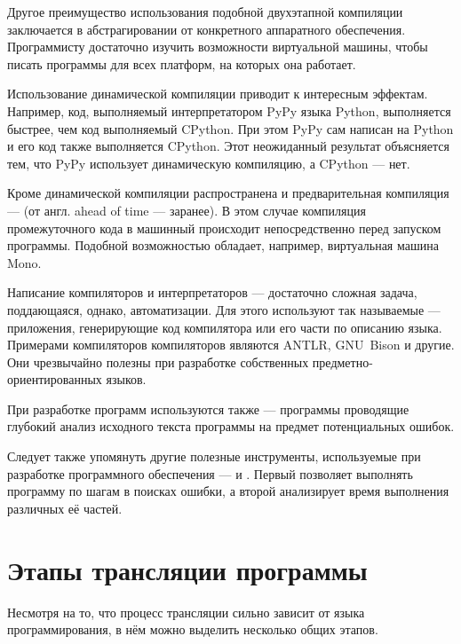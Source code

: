 Другое преимущество использования подобной двухэтапной компиляции
заключается в абстрагировании от конкретного аппаратного
обеспечения. Программисту достаточно изучить возможности виртуальной
машины, чтобы писать программы для всех платформ, на которых она
работает.

Использование динамической компиляции приводит к интересным эффектам.
Например, код, выполняемый интерпретатором PyPy языка Python,
выполняется быстрее, чем код выполняемый CPython. При этом PyPy сам
написан на Python и его код также выполняется CPython. Этот
неожиданный результат объясняется тем, что PyPy использует
динамическую компиляцию, а CPython — нет.

Кроме динамической компиляции распространена и предварительная
компиляция —  (от англ. ahead of
time — заранее). В этом случае компиляция промежуточного кода в
машинный происходит непосредственно перед запуском программы. Подобной
возможностью обладает, например, виртуальная машина Mono.


Написание компиляторов и интерпретаторов — достаточно сложная задача,
поддающаяся, однако, автоматизации. Для этого используют так
называемые  —
приложения, генерирующие код компилятора или его части по описанию
языка. Примерами компиляторов компиляторов являются ANTLR, GNU~Bison и
другие. Они чрезвычайно полезны при разработке собственных
предметно-ориентированных языков.

При разработке программ используются также
 — программы
проводящие глубокий анализ исходного текста программы на предмет
потенциальных ошибок.

Следует также упомянуть другие полезные инструменты, используемые при
разработке программного обеспечения —  и
. Первый позволяет выполнять
программу по шагам в поисках ошибки, а второй анализирует время
выполнения различных её частей.

\section{Этапы трансляции программы}


Несмотря на то, что процесс трансляции сильно зависит от языка
программирования, в нём можно выделить несколько общих этапов.


